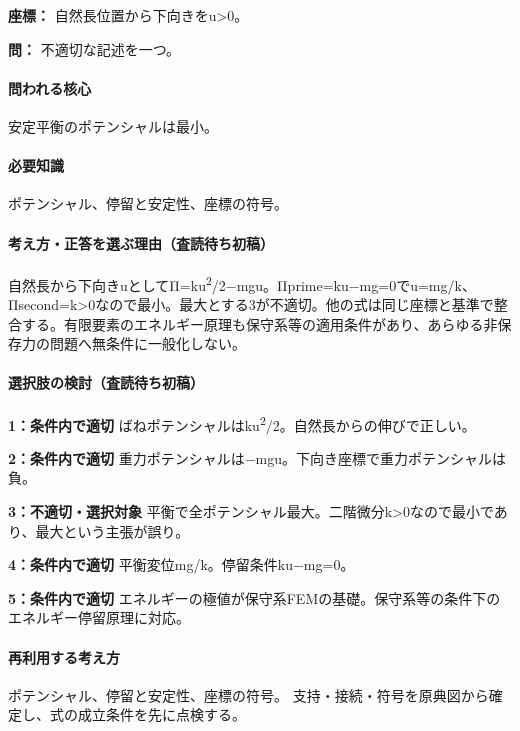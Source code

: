 \noindent\textbf{座標：} 自然長位置から下向きをu>0。\par

\noindent\textbf{問：} 不適切な記述を一つ。\par

\paragraph{問われる核心} 安定平衡のポテンシャルは最小。

\paragraph{必要知識} ポテンシャル、停留と安定性、座標の符号。

\paragraph{考え方・正答を選ぶ理由（査読待ち初稿）} 自然長から下向きuとしてΠ=ku\textsuperscript{2}/2−mgu。Πprime=\allowbreak{}ku−mg=\allowbreak{}0でu=\allowbreak{}mg/k、Πsecond=\allowbreak{}k>0なので最小。最大とする3が不適切。他の式は同じ座標と基準で整合する。有限要素のエネルギー原理も保守系等の適用条件があり、あらゆる非保存力の問題へ無条件に一般化しない。

\paragraph{選択肢の検討（査読待ち初稿）}\mbox{}\par

\noindent\textbf{1：条件内で適切} ばねポテンシャルはku\textsuperscript{2}/2。自然長からの伸びで正しい。\par

\noindent\textbf{2：条件内で適切} 重力ポテンシャルは−mgu。下向き座標で重力ポテンシャルは負。\par

\noindent\textbf{3：不適切・選択対象} 平衡で全ポテンシャル最大。二階微分k>0なので最小であり、最大という主張が誤り。\par

\noindent\textbf{4：条件内で適切} 平衡変位mg/k。停留条件ku−mg=\allowbreak{}0。\par

\noindent\textbf{5：条件内で適切} エネルギーの極値が保守系FEMの基礎。保守系等の条件下のエネルギー停留原理に対応。\par

\paragraph{再利用する考え方} ポテンシャル、停留と安定性、座標の符号。 支持・接続・符号を原典図から確定し、式の成立条件を先に点検する。

